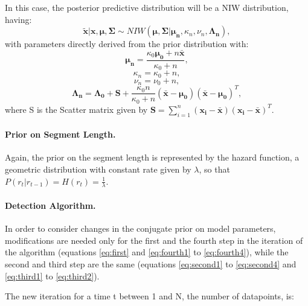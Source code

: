 \documentclass[11pt,twoside,a4paper]{report}
\begin{document}
In this case, the posterior predictive distribution will be a NIW distribution, having:
\begin{equation}
\boldsymbol{\tilde{x}} | \boldsymbol{x}, \boldsymbol{\mu}, \boldsymbol{\Sigma}  \sim NIW(\boldsymbol{\mu}, \boldsymbol{\Sigma} | \boldsymbol{\mu_n}, \kappa_n, \nu_n, \boldsymbol{\Lambda_n}),
\end{equation}
with parameters directly derived from the prior distribution with:
\begin{equation}
\boldsymbol{\mu_n} = \frac{\kappa_0\boldsymbol{\mu_0} + n\boldsymbol{\bar{x}}}{\kappa_0 + n},
\end{equation}
\begin{equation}
\kappa_n = \kappa_0 + n,
\end{equation}
\begin{equation}
\nu_n = \nu_0 + n,
\end{equation}
\begin{equation}
\boldsymbol{\Lambda_n} = \boldsymbol{\Lambda_0} + \boldsymbol{S} + \frac{\kappa_0n}{\kappa_0 + n}(\boldsymbol{\bar{x}} - \boldsymbol{\mu_0})(\boldsymbol{\bar{x}} - \boldsymbol{\mu_0})^T, 
\end{equation}
where S is the Scatter matrix given by \(\boldsymbol{S} = \sum_{i=1}^{n}(\boldsymbol{x_i} - \boldsymbol{\bar{x}})(\boldsymbol{x_i} - \boldsymbol{\bar{x}})^T\).

\paragraph{Prior on Segment Length.}

Again, the prior on the segment length is represented by the hazard function, a geometric distribution with constant rate given by $\lambda$, so that $P(r_t | r_{t - 1}) = H(r_t) = \frac{1}{\lambda}$.

\paragraph{Detection Algorithm.}

In order to consider changes in the conjugate prior on model parameters, modifications are needed only for the first and the fourth step in the iteration of the algorithm (equations \ref{eq:first} and \ref{eq:fourth1} to \ref{eq:fourth4}), while the second and third step are the same (equations \ref{eq:second1} to \ref{eq:second4} and \ref{eq:third1} to \ref{eq:third2}).

The new iteration for a time t between 1 and N, the number of datapoints, is:
\end{document}
